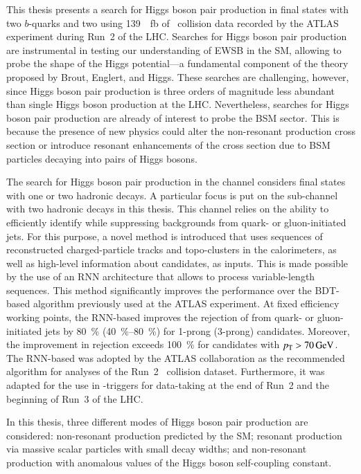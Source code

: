 This thesis presents a search for Higgs boson pair production in final states
with two $b$-quarks and two \tauleptons using \SI{139}{\per\femto\barn} of
\pp~collision data recorded by the ATLAS experiment during Run~2 of the
LHC. Searches for Higgs boson pair production are instrumental in testing our
understanding of EWSB in the SM, allowing to probe the shape of the Higgs
potential---a fundamental component of the theory proposed by Brout, Englert,
and Higgs. These searches are challenging, however, since Higgs boson pair
production is three orders of magnitude less abundant than single Higgs boson
production at the LHC. Nevertheless, searches for Higgs boson pair production
are already of interest to probe the BSM sector. This is because the presence of
new physics could alter the non-resonant \HH production cross section or
introduce resonant enhancements of the cross section due to BSM particles
decaying into pairs of Higgs bosons.


The search for Higgs boson pair production in the \bbtautau channel considers
final states with one or two hadronic \taulepton decays. A particular focus is
put on the sub-channel with two hadronic \taulepton decays in this thesis. This
channel relies on the ability to efficiently identify \tauhadvis while
suppressing backgrounds from quark- or gluon-initiated jets. For this purpose, a
novel \tauid method is introduced that uses sequences of reconstructed
charged-particle tracks and topo-clusters in the calorimeters, as well as
high-level information about \tauhadvis candidates, as inputs. This is made
possible by the use of an RNN architecture that allows to process
variable-length sequences. This method significantly improves the \tauid
performance over the BDT-based algorithm previously used at the ATLAS
experiment. At fixed \tauhadvis efficiency working points, the RNN-based \tauid
improves the rejection of \faketauhadvis from quark- or gluon-initiated jets by
\SI{80}{\percent} (\SIrange{40}{80}{\percent}) for 1-prong (3-prong) \tauhadvis
candidates. Moreover, the improvement in \faketauhadvis rejection exceeds
\SI{100}{\percent} for candidates with $\pT > \SI{70}{\GeV}$. The RNN-based
\tauid was adopted by the ATLAS collaboration as the recommended \tauid
algorithm for analyses of the Run~2 \pp~collision dataset. Furthermore, it was
adapted for the use in \tauhadvis-triggers for data-taking at the end of Run~2
and the beginning of Run~3 of the LHC.


In this thesis, three different modes of Higgs boson pair production are
considered: non-resonant \HH production predicted by the SM; resonant \HH
production via massive scalar particles with small decay widths; and
non-resonant \HH production with anomalous values of the Higgs boson
self-coupling constant.


